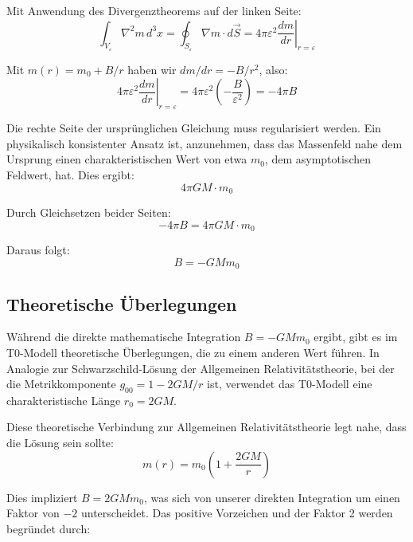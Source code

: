 \documentclass[12pt,a4paper]{article}
\begin{document}
Mit Anwendung des Divergenztheorems auf der linken Seite:
\begin{equation}
	\int_{V_\varepsilon} \nabla^2 m \, d^3x = \oint_{S_\varepsilon} \nabla m \cdot d\vec{S} = 4\pi \varepsilon^2 \left.\frac{dm}{dr}\right|_{r=\varepsilon}
\end{equation}

Mit $m(r) = m_0 + B/r$ haben wir $dm/dr = -B/r^2$, also:
\begin{equation}
	4\pi \varepsilon^2 \left.\frac{dm}{dr}\right|_{r=\varepsilon} = 4\pi \varepsilon^2 \left(-\frac{B}{\varepsilon^2}\right) = -4\pi B
\end{equation}

Die rechte Seite der ursprünglichen Gleichung muss regularisiert werden. Ein physikalisch konsistenter Ansatz ist, anzunehmen, dass das Massenfeld nahe dem Ursprung einen charakteristischen Wert von etwa $m_0$, dem asymptotischen Feldwert, hat. Dies ergibt:
\begin{equation}
	4\pi G M \cdot m_0
\end{equation}

Durch Gleichsetzen beider Seiten:
\begin{equation}
	-4\pi B = 4\pi G M \cdot m_0
\end{equation}

Daraus folgt:
\begin{equation}
	B = -G M m_0
\end{equation}

\subsection{Theoretische Überlegungen}
\label{subsec:theoretical_considerations}

Während die direkte mathematische Integration $B = -G M m_0$ ergibt, gibt es im T0-Modell theoretische Überlegungen, die zu einem anderen Wert führen. In Analogie zur Schwarzschild-Lösung der Allgemeinen Relativitätstheorie, bei der die Metrikkomponente $g_{00} = 1 - 2GM/r$ ist, verwendet das T0-Modell eine charakteristische Länge $r_0 = 2GM$.

Diese theoretische Verbindung zur Allgemeinen Relativitätstheorie legt nahe, dass die Lösung sein sollte:
\begin{equation}
	m(r) = m_0\left(1 + \frac{2GM}{r}\right)
\end{equation}

Dies impliziert $B = 2GMm_0$, was sich von unserer direkten Integration um einen Faktor von $-2$ unterscheidet. Das positive Vorzeichen und der Faktor 2 werden begründet durch:
\end{document}
